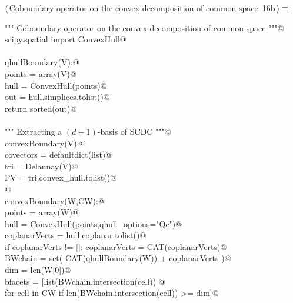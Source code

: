 \documentclass[11pt,oneside]{article}	%
\begin{document}
\begin{flushleft} \small \label{scrap18}
\protect{}$\langle\,$Coboundary operator on the convex decomposition of common space\nobreak\ {\footnotesize 16b}$\,\rangle\equiv$
\vspace{-1ex}
\begin{list}{}{} \item
\mbox{}\verb@""" Coboundary operator on the convex decomposition of common space """@\\
\mbox{}\verb@from scipy.spatial import ConvexHull@\\
\mbox{}\verb@@\\
\mbox{}\verb@def qhullBoundary(V):@\\
\mbox{}\verb@   points = array(V)@\\
\mbox{}\verb@   hull = ConvexHull(points)@\\
\mbox{}\verb@   out = hull.simplices.tolist()@\\
\mbox{}\verb@   return sorted(out)@\\
\mbox{}\verb@@\\
\mbox{}\verb@""" Extracting a $(d-1)$-basis of SCDC """@\\
\mbox{}\verb@def convexBoundary(V):@\\
\mbox{}\verb@   covectors = defaultdict(list)@\\
\mbox{}\verb@   tri = Delaunay(V)@\\
\mbox{}\verb@   FV = tri.convex_hull.tolist()@\\
\mbox{}\verb@   @\\
\mbox{}\verb@def convexBoundary(W,CW):@\\
\mbox{}\verb@   points = array(W)@\\
\mbox{}\verb@   hull = ConvexHull(points,qhull_options="Qc")@\\
\mbox{}\verb@   coplanarVerts = hull.coplanar.tolist()@\\
\mbox{}\verb@   if coplanarVerts != []:  coplanarVerts = CAT(coplanarVerts)@\\
\mbox{}\verb@   BWchain = set( CAT(qhullBoundary(W)) + coplanarVerts )@\\
\mbox{}\verb@   dim = len(W[0])@\\
\mbox{}\verb@   bfacets = [list(BWchain.intersection(cell)) @\\
\mbox{}\verb@               for cell in CW if len(BWchain.intersection(cell)) >= dim]@\\

\end{list}
\end{flushleft}
\end{document}
